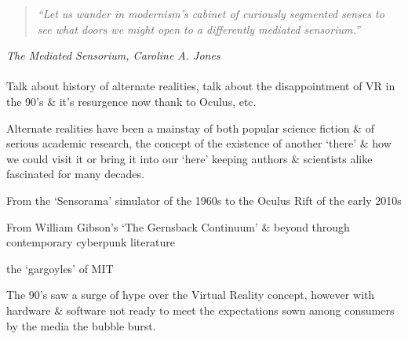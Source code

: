 \begin{quote}
	\textit{``Let us wander in modernism's cabinet of curiously segmented senses to see what doors we might open to a differently mediated sensorium.''}
\end{quote}
\hfill \textit{The Mediated Sensorium, Caroline A. Jones}
\\
\\



Talk about history of alternate realities, talk about the disappointment of VR in the 90's \& it's resurgence now thank to Oculus, etc.






Alternate realities have been a mainstay of both popular science fiction \& of serious academic research, the concept of the existence of another `there' \& how we could visit it or bring it into our `here'
keeping authors \& scientists alike fascinated for many decades.

From the `Sensorama' simulator of the 1960s to the Oculus Rift of the early 2010s

From William Gibson's `The Gernsback Continuum' \& beyond through contemporary cyberpunk literature

the `gargoyles' of MIT


The 90's saw a surge of hype over the Virtual Reality concept, however with hardware \& software not ready to meet the expectations sown among consumers by the media the bubble burst.

